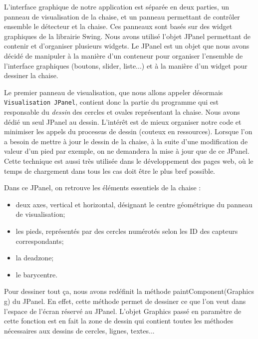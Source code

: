 \documentclass{polytech/polytech}
\begin{document}
L'interface graphique de notre application est séparée en deux parties, un panneau de visualisation de la chaise, et un panneau permettant de contrôler ensemble le détecteur et la chaise.
Ces panneaux sont basés sur des widget graphiques de la librairie Swing. 
Nous avons utilisé l'objet JPanel permettant de contenir et d'organiser plusieurs widgets.
 Le JPanel est un objet que nous avons décidé de manipuler à la manière d'un conteneur pour organiser l'ensemble de l'interface graphiques (boutons, slider, liste...) et à la manière d'un widget pour dessiner la chaise.

Le premier panneau de visualisation, que nous allons appeler désormais \texttt{Visualisation JPanel}, contient donc la partie du programme qui est responsable du \textit{dessin} des cercles et ovales représentant la chaise.
Nous avons dédié un seul JPanel au dessin.
L'intérêt est de mieux organiser notre code et minimiser les appels du processus de dessin (couteux en ressources). 
Lorsque l'on a besoin de mettre à jour le dessin de la chaise, à la suite d'une modification de valeur d'un pied par exemple, on ne demandera la mise à jour que de ce JPanel.
Cette technique est aussi très utilisée dans le développement des pages web, où le temps de chargement dans tous les cas doit être le plus bref possible.

Dans ce JPanel, on retrouve les éléments essentiels de la chaise : 

\begin{itemize}
\item deux axes, vertical et horizontal, désignant le centre géométrique du panneau de visualisation;
\item les pieds, représentés par des cercles numérotés selon les ID des capteurs correspondants;
\item la deadzone;
\item le barycentre. 
\end{itemize}

Pour dessiner tout ça, nous avons redéfinit la méthode paintComponent(Graphics g) du JPanel. En effet, cette méthode permet de dessiner ce que l'on veut dans l'espace de l'écran réservé au JPanel. L'objet Graphics passé en paramètre de cette fonction est en fait la zone de dessin qui contient toutes les méthodes nécessaires aux dessins de cercles, lignes, textes...
\end{document}
